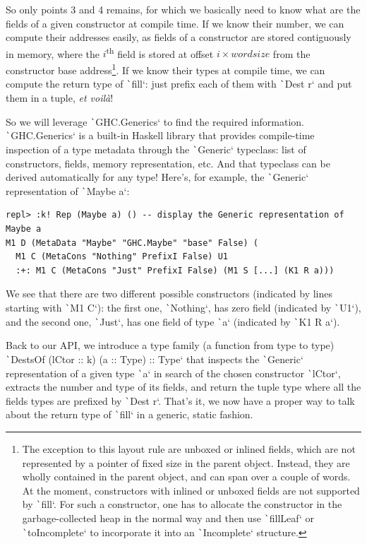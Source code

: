 \documentclass[english]{jflart}
\begin{document}
So only points 3 and 4 remains, for which we basically need to know what are the fields of a given constructor at compile time. If we know their number, we can compute their addresses easily, as fields of a constructor are stored contiguously in memory, where the $i$\textsuperscript{th} field is stored at offset $i \times wordsize$ from the constructor base address\footnote{The exception to this layout rule are unboxed or inlined fields, which are not represented by a pointer of fixed size in the parent object. Instead, they are wholly contained in the parent object, and can span over a couple of words. At the moment, constructors with inlined or unboxed fields are not supported by \texttt`fill`. For such a constructor, one has to allocate the constructor in the garbage-collected heap in the normal way and then use \texttt`fillLeaf` or \texttt`toIncomplete` to incorporate it into an \texttt`Incomplete` structure.}. If we know their types at compile time, we can compute the return type of \texttt`fill`: just prefix each of them with \texttt`Dest r` and put them in a tuple, \emph{et voilà}!

So we will leverage \texttt`GHC.Generics` to find the required information. \texttt`GHC.Generics` is a built-in Haskell library that provides compile-time inspection of a type metadata through the \texttt`Generic` typeclass: list of constructors, fields, memory representation, etc. And that typeclass can be derived automatically for any type! Here's, for example, the \texttt`Generic` representation of \texttt`Maybe a`:

{\small
\begin{verbatim}
repl> :k! Rep (Maybe a) () -- display the Generic representation of Maybe a
M1 D (MetaData "Maybe" "GHC.Maybe" "base" False) (
  M1 C (MetaCons "Nothing" PrefixI False) U1
  :+: M1 C (MetaCons "Just" PrefixI False) (M1 S [...] (K1 R a)))
\end{verbatim}
}

We see that there are two different possible constructors (indicated by lines starting with \texttt`M1 C`): the first one, \texttt`Nothing`, has zero field (indicated by \texttt`U1`), and the second one, \texttt`Just`, has one field of type \texttt`a` (indicated by \texttt`K1 R a`).

Back to our API, we introduce a type family (a function from type to type) \texttt`DestsOf (lCtor :: k) (a :: Type) :: Type` that inspects the \texttt`Generic` representation of a given type \texttt`a` in search of the chosen constructor \texttt`lCtor`, extracts the number and type of its fields, and return the tuple type where all the fields types are prefixed by \texttt`Dest r`. That's it, we now have a proper way to talk about the return type of \texttt`fill` in a generic, static fashion.
\end{document}
